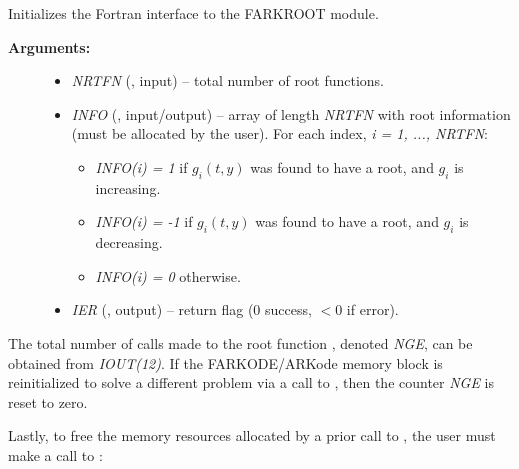 \documentclass[letterpaper,10pt,english]{sphinxmanual}
\begin{document}
\begin{fulllineitems}
\label{f_interface/Rootfinding:f/_/FARKROOTINFO}
Initializes the Fortran interface to the FARKROOT module.
\begin{description}
\item[{\textbf{Arguments:}}] \leavevmode\begin{itemize}
\item {} 
\emph{NRTFN} (, input) -- total number of root functions.

\item {} 
\emph{INFO} (, input/output) -- array of length \emph{NRTFN} with
root information (must be allocated by the user).  For each
index, \emph{i = 1, ..., NRTFN}:
\begin{itemize}
\item {} 
\emph{INFO(i) = 1}  if \(g_i(t,y)\) was found to have a root,
and \(g_i\) is increasing.

\item {} 
\emph{INFO(i) = -1}  if \(g_i(t,y)\) was found to have a root,
and \(g_i\) is decreasing.

\item {} 
\emph{INFO(i) = 0}  otherwise.

\end{itemize}

\item {} 
\emph{IER} (, output) -- return flag (0 success, \(<0\)
if error).

\end{itemize}

\end{description}

\end{fulllineitems}


The total number of calls made to the root function
{\hyperref[f_interface/Rootfinding:f/_/FARKROOTFN]{\emph{}}}, denoted \emph{NGE}, can be obtained from
\emph{IOUT(12)}.  If the FARKODE/ARKode memory block is reinitialized to
solve a different problem via a call to {\hyperref[f_interface/Usage:f/_/FARKREINIT]{\emph{}}}, then
the counter \emph{NGE} is reset to zero.

Lastly, to free the memory resources allocated by a prior call to
{\hyperref[f_interface/Rootfinding:f/_/FARKROOTINIT]{\emph{}}}, the user must make a call to
{\hyperref[f_interface/Rootfinding:f/_/FARKROOTFREE]{\emph{}}}:
\end{document}
